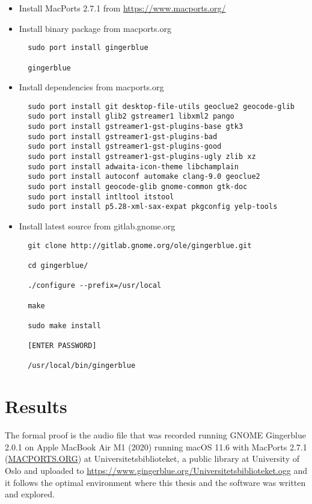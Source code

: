 \documentclass[UKenglish]{ifimaster}  %
\begin{document}
\begin{itemize}
\item Install MacPorts 2.7.1 from \url{https://www.macports.org/}
\item Install binary package from macports.org \begin{verbatim}
  sudo port install gingerblue

  gingerblue
\end{verbatim}

\item Install dependencies from macports.org \begin{verbatim}
  sudo port install git desktop-file-utils geoclue2 geocode-glib
  sudo port install glib2 gstreamer1 libxml2 pango
  sudo port install gstreamer1-gst-plugins-base gtk3 
  sudo port install gstreamer1-gst-plugins-bad
  sudo port install gstreamer1-gst-plugins-good
  sudo port install gstreamer1-gst-plugins-ugly zlib xz
  sudo port install adwaita-icon-theme libchamplain
  sudo port install autoconf automake clang-9.0 geoclue2
  sudo port install geocode-glib gnome-common gtk-doc
  sudo port install intltool itstool
  sudo port install p5.28-xml-sax-expat pkgconfig yelp-tools
\end{verbatim}  
\item Install latest source from gitlab.gnome.org \begin{verbatim}
  git clone http://gitlab.gnome.org/ole/gingerblue.git

  cd gingerblue/

  ./configure --prefix=/usr/local

  make

  sudo make install

  [ENTER PASSWORD]

  /usr/local/bin/gingerblue
\end{verbatim}
\end{itemize}

\chapter{Results}                     %

The formal proof is the audio file that was recorded running GNOME
Gingerblue 2.0.1 on Apple MacBook Air M1 (2020) running macOS 11.6
with MacPorts 2.7.1 (\url{MACPORTS.ORG}) at Universitetsbiblioteket,
a public library at University of Oslo and uploaded to
\url{https://www.gingerblue.org/Universitetsbiblioteket.ogg} and it
follows the optimal environment where this thesis and the software
was written and explored.
\end{document}
